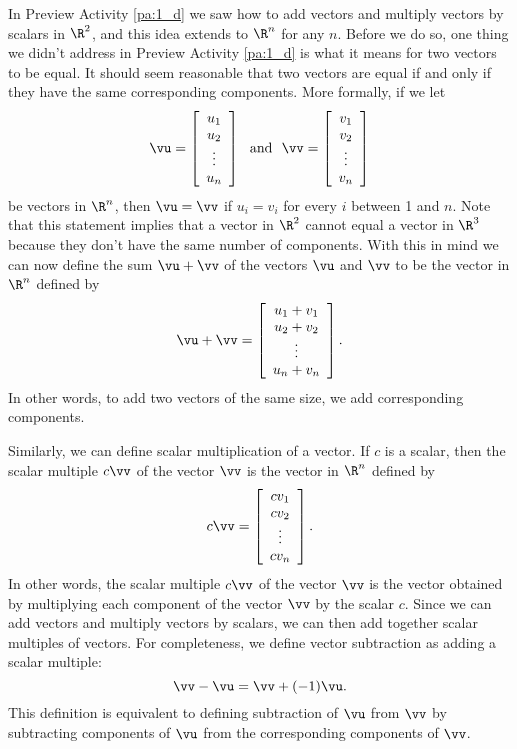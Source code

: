 In Preview Activity \ref{pa:1_d} we saw how to add vectors and multiply vectors by scalars in $\R^2$, and this idea extends to $\R^n$ for any $n$. Before we do so, one thing we didn't address in Preview Activity \ref{pa:1_d}  is what it means for two vectors to be equal. It should seem reasonable that two vectors are equal if and only if they have the same corresponding components. More formally, if we let  
\[\vu = \left[ \begin{array}{c} u_1 \\ u_2 \\ \vdots \\ u_n \end{array} \right] \ \text{ and } \ \vv = \left[ \begin{array}{c} v_1 \\ v_2 \\ \vdots \\ v_n \end{array} \right]\]
be vectors in $\R^n$, then $\vu = \vv$ if $u_i = v_i$ for every $i$ between 1 and $n$. Note that this statement implies that a vector in $\R^2$ cannot equal a vector in $\R^3$ because they don't have the same number of components. With this in mind we can now define the sum $\vu + \vv$ of the vectors $\vu$ and $\vv$ to be the vector in $\R^n$ defined by
\[\vu + \vv = \left[ \begin{array}{c} u_1+v_1 \\ u_2+v_2 \\ \vdots \\ u_n+v_n \end{array} \right].\]
In other words, to add two vectors of the same size, we add corresponding components.

Similarly, we can define scalar multiplication of a vector. If $c$ is a scalar, then the scalar multiple $c \vv$ of the vector $\vv$ is the vector in $\R^n$ defined by
\[c\vv = \left[ \begin{array}{c} cv_1 \\ cv_2 \\ \vdots \\ cv_n \end{array} \right].\]
In other words, the scalar multiple $c\vv$ of the vector $\vv$ is the vector obtained by multiplying each component of the vector $\vv$ by the scalar $c$. Since we can add vectors and multiply vectors by scalars, we can then add together scalar multiples of vectors. For completeness, we define vector subtraction as adding a scalar multiple:
\[\vv - \vu = \vv + (-1)\vu.\]
This definition is equivalent to defining subtraction of $\vu$ from $\vv$ by subtracting components of $\vu$ from the corresponding components of $\vv$. 


